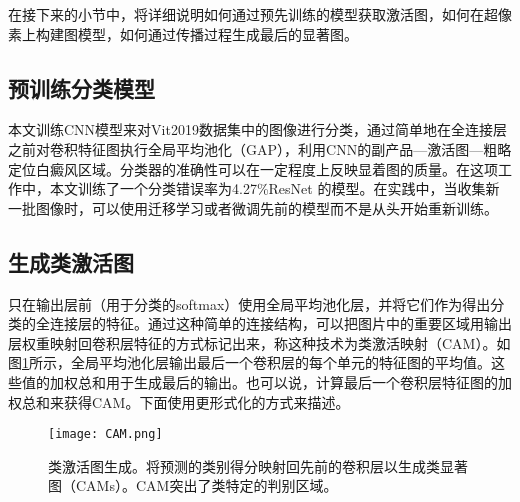在接下来的小节中，将详细说明如何通过预先训练的模型获取激活图，如何在超像素上构建图模型，如何通过传播过程生成最后的显著图。

\subsection{预训练分类模型}

本文训练CNN模型来对Vit2019数据集中的图像进行分类，通过简单地在全连接层之前对卷积特征图执行全局平均池化（GAP），利用CNN的副产品---激活图---粗略定位白癜风区域。分类器的准确性可以在一定程度上反映显着图的质量\cite{simonyan2013deep, zhou2016learning}。在这项工作中，本文训练了一个分类错误率为4.27\%ResNet \cite{He_2016_CVPR}的模型。在实践中，当收集新一批图像时，可以使用迁移学习或者微调先前的模型而不是从头开始重新训练。

\subsection{生成类激活图}
只在输出层前（用于分类的softmax）使用全局平均池化层，并将它们作为得出分类的全连接层的特征。通过这种简单的连接结构，可以把图片中的重要区域用输出层权重映射回卷积层特征的方式标记出来，称这种技术为类激活映射（CAM）。如图\ref{fig:CAM}所示，全局平均池化层输出最后一个卷积层的每个单元的特征图的平均值。这些值的加权总和用于生成最后的输出。也可以说，计算最后一个卷积层特征图的加权总和来获得CAM。下面使用更形式化的方式来描述。
\begin{figure}[htbp]
\begin{center}
\texttt{[image: CAM.png]}
\end{center}
\caption{类激活图生成\cite{zhou2016learning}。将预测的类别得分映射回先前的卷积层以生成类显著图（CAMs）。CAM突出了类特定的判别区域。}
\label{fig:CAM}
\end{figure}

